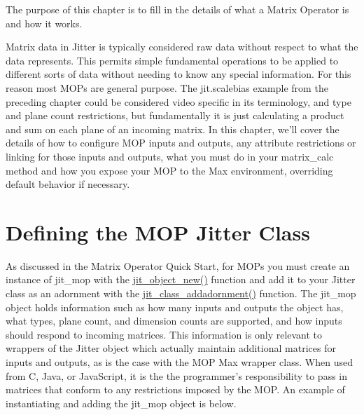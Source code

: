 The purpose of this chapter is to fill in the details of what a Matrix Operator is and how it works.

Matrix data in Jitter is typically considered raw data without respect to what the data represents. This permits simple fundamental operations to be applied to different sorts of data without needing to know any special information. For this reason most MOPs are general purpose. The jit.scalebias example from the preceding chapter could be considered video specific in its terminology, and type and plane count restrictions, but fundamentally it is just calculating a product and sum on each plane of an incoming matrix. In this chapter, we'll cover the details of how to configure MOP inputs and outputs, any attribute restrictions or linking for those inputs and outputs, what you must do in your matrix\_\-calc method and how you expose your MOP to the Max environment, overriding default behavior if necessary.\hypertarget{chapter_jit_mopdetails_chapter_jit_mopdetails_classes}{}\section{Defining the MOP Jitter Class}\label{chapter_jit_mopdetails_chapter_jit_mopdetails_classes}
As discussed in the Matrix Operator Quick Start, for MOPs you must create an instance of jit\_\-mop with the \hyperlink{group__objectmod_gabde2eb49750992ec4125af862b402342}{jit\_\-object\_\-new()} function and add it to your Jitter class as an adornment with the \hyperlink{group__classmod_ga408738c800435bf50d092ce52b223327}{jit\_\-class\_\-addadornment()} function. The jit\_\-mop object holds information such as how many inputs and outputs the object has, what types, plane count, and dimension counts are supported, and how inputs should respond to incoming matrices. This information is only relevant to wrappers of the Jitter object which actually maintain additional matrices for inputs and outputs, as is the case with the MOP Max wrapper class. When used from C, Java, or JavaScript, it is the the programmer's responsibility to pass in matrices that conform to any restrictions imposed by the MOP. An example of instantiating and adding the jit\_\-mop object is below.


